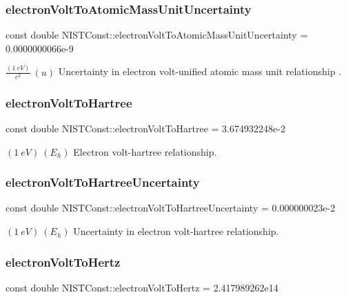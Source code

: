 \subsubsection{\texorpdfstring{electron\+Volt\+To\+Atomic\+Mass\+Unit\+Uncertainty}{electronVoltToAtomicMassUnitUncertainty}}
{\footnotesize\ttfamily const double N\+I\+S\+T\+Const\+::electron\+Volt\+To\+Atomic\+Mass\+Unit\+Uncertainty = 0.\+0000000066e-\/9}

$\frac{(1\ eV)}{c^2}\ (u)$ Uncertainty in electron volt-\/unified atomic mass unit relationship . \mbox{\label{group___electron_volt_gab05ba497cc5a6bd566356469e9de003a}} 
\subsubsection{\texorpdfstring{electron\+Volt\+To\+Hartree}{electronVoltToHartree}}
{\footnotesize\ttfamily const double N\+I\+S\+T\+Const\+::electron\+Volt\+To\+Hartree = 3.\+674932248e-\/2}

$(1\ eV) \ (E_h)$ Electron volt-\/hartree relationship. \mbox{\label{group___electron_volt_ga0abfaf6edc874d80488beab0633f353a}} 
\subsubsection{\texorpdfstring{electron\+Volt\+To\+Hartree\+Uncertainty}{electronVoltToHartreeUncertainty}}
{\footnotesize\ttfamily const double N\+I\+S\+T\+Const\+::electron\+Volt\+To\+Hartree\+Uncertainty = 0.\+000000023e-\/2}

$(1\ eV) \ (E_h)$ Uncertainty in electron volt-\/hartree relationship. \mbox{\label{group___electron_volt_gae80c1242d33bf681a09a87d20cd4162e}} 
\subsubsection{\texorpdfstring{electron\+Volt\+To\+Hertz}{electronVoltToHertz}}
{\footnotesize\ttfamily const double N\+I\+S\+T\+Const\+::electron\+Volt\+To\+Hertz = 2.\+417989262e14}

